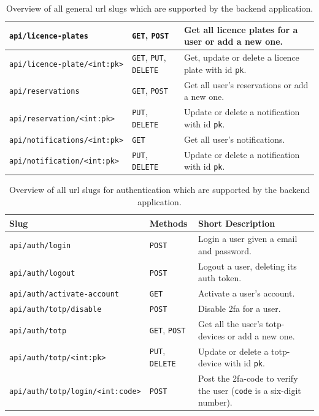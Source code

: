 \begin{appendices}
\begin{table}[htp]
\begin{tabular}{|l|l|p{7cm}|}
        \hline
        \texttt{api/licence-plates} &  \texttt{GET}, \texttt{POST} & Get all licence plates for a user or add a new one.\\
        \hline
        \texttt{api/licence-plate/<int:pk>} &  \texttt{GET}, \texttt{PUT}, \texttt{DELETE} & Get, update or delete a licence plate with id \texttt{pk}. \\
        \hline
        \texttt{api/reservations} &  \texttt{GET}, \texttt{POST} & Get all user's reservations or add a new one.\\
        \hline
        \texttt{api/reservation/<int:pk>} &  \texttt{PUT}, \texttt{DELETE
        } & Update or delete a notification with id \texttt{pk}.\\
        \hline
        \texttt{api/notifications/<int:pk>} &  \texttt{GET} & Get all user's notifications.\\
        \hline
        \texttt{api/notification/<int:pk>} &  \texttt{PUT}, \texttt{DELETE
        } & Update or delete a notification with id \texttt{pk}.\\
        \hline
        \end{tabular}
    \caption{Overview of all general \ac{url} slugs which are supported by the backend application.}
    \label{tab:my_label}
\end{table}


\begin{table}[htp]
    \centering
    \begin{tabular}{|l|l|p{7cm}|}
    \hline
    \textbf{Slug} & \textbf{Methods} & \textbf{Short Description}  \\
    \hline
    \hline
        \texttt{api/auth/login} &  \texttt{POST} & Login a user given a email and password.\\
        \hline
        \texttt{api/auth/logout} &  \texttt{POST} & Logout a user, deleting its auth token.\\
        \hline
        \texttt{api/auth/activate-account} &  \texttt{GET} & Activate a user's account.\\
        \hline
        \texttt{api/auth/totp/disable} &  \texttt{POST} & Disable \ac{2fa} for a user.\\
        \hline
        \texttt{api/auth/totp} &  \texttt{GET}, \texttt{POST} & Get all the user's \ac{totp}-devices or add a new one.\\
        \hline
        \texttt{api/auth/totp/<int:pk>} &  \texttt{PUT}, \texttt{DELETE} & Update or delete a \ac{totp}-device with id \texttt{pk}.\\
        \hline
        \texttt{api/auth/totp/login/<int:code>} & \texttt{POST} & Post the \ac{2fa}-code to verify the user (\texttt{code} is a six-digit number).\\
        \hline
    \end{tabular}
    \caption{Overview of all \ac{url} slugs for authentication which are supported by the backend application.}
    \label{tab:my_label}
\end{table}



\end{appendices}
